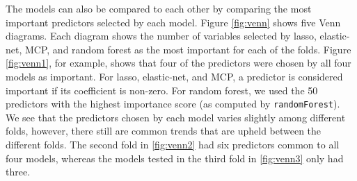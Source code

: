 \documentclass{article}
\begin{document}
The models can also be compared to each other by comparing the most important predictors selected by each model. Figure \ref{fig:venn} shows five Venn diagrams. Each diagram shows the number of variables selected by lasso, elastic-net, MCP, and random forest as the most important for each of the folds. Figure \ref{fig:venn1}, for example, shows that four of the predictors were chosen by all four models as important. For lasso, elastic-net, and MCP, a predictor is considered important if its coefficient is non-zero. For random forest, we used the 50 predictors with the highest importance score (as computed by \lstinline!randomForest!). We see that the predictors chosen by each model varies slightly among different folds, however, there still are common trends that are upheld between the different folds. The second fold in \ref{fig:venn2} had six predictors common to all four models, whereas the models tested in the third fold in \ref{fig:venn3} only had three.
\end{document}
